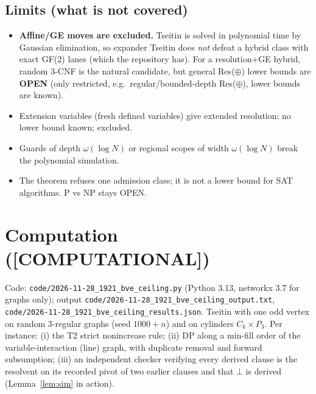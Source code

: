 \documentclass[11pt]{article}
\theoremstyle{definition}
\newcommand{\lab}[1]{\textbf{[#1]}}
\begin{document}
\subsection*{Limits (what is not covered)}
\begin{itemize}
\item \textbf{Affine/GE moves are excluded.} Tseitin is solved in polynomial time by Gaussian elimination, so
expander Tseitin does \emph{not} defeat a hybrid class with exact GF(2) lanes (which the repository has). For a
resolution+GE hybrid, random 3-CNF is the natural candidate, but general Res($\oplus$) lower bounds are
\textbf{OPEN} (only restricted, e.g.\ regular/bounded-depth Res($\oplus$), lower bounds are known).
\item Extension variables (fresh defined variables) give extended resolution; no lower bound known; excluded.
\item Guards of depth $\omega(\log N)$ or regional scopes of width $\omega(\log N)$ break the polynomial simulation.
\item The theorem refuses one admission class; it is not a lower bound for SAT algorithms. P vs NP stays OPEN.
\end{itemize}

\section{Computation (\lab{COMPUTATIONAL})}
Code: \texttt{code/2026-11-28\_1921\_bve\_ceiling.py} (Python 3.13, networkx 3.7 for graphs only); output
\texttt{code/2026-11-28\_1921\_bve\_ceiling\_output.txt}, \texttt{code/2026-11-28\_1921\_bve\_ceiling\_results.json}.
Tseitin with one odd vertex on random 3-regular graphs (seed $1000+n$) and on cylinders $C_k\times P_3$.
Per instance: (i) the T2 strict nonincrease rule; (ii) DP along a min-fill order of the variable-interaction
(line) graph, with duplicate removal and forward subsumption; (iii) an independent checker verifying every derived
clause is the resolvent on its recorded pivot of two earlier clauses and that $\bot$ is derived
(Lemma~\ref{lem:sim} in action).
\end{document}
